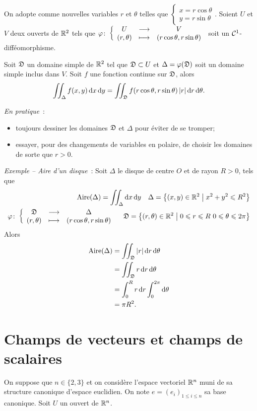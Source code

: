 \begin{theo}
  On adopte comme nouvelles variables \(r\) et \(\theta\) telles que \(\begin{cases} x=r\cos\theta \\ y=r\sin\theta \end{cases}\). Soient \(U\) et \(V\) deux ouverts de \(\mathbb{R}^2\) tels que \(\varphi\colon \left\{\begin{array}{ccc} U & \longrightarrow &V\\ (r, \theta) & \longmapsto & (r\cos\theta, r\sin\theta) \end{array} \right.\) soit un \(\mathcal{C}^{1}\)-difféomorphisme.

Soit \(\mathfrak{D}\) un domaine simple de \(\mathbb{R}^2\) tel que \(\mathfrak{D} \subset U\) et \(\Delta=\varphi(\mathfrak{D})\) soit un domaine simple inclus dans \(V\). Soit \(f\) une fonction continue sur \(\mathfrak{D}\), alors
\begin{equation}
   \iint_\Delta f(x,y)\mathop{}\mathopen{}\mathrm{d} x \mathop{}\mathopen{}\mathrm{d} y = \iint_{\mathfrak{D}} f(r\cos\theta, r\sin\theta) \left\lvert r\right\rvert\mathop{}\mathopen{}\mathrm{d} r \mathop{}\mathopen{}\mathrm{d} \theta.
\end{equation}
\end{theo}

\emph{En pratique}~:
\begin{itemize}
\item toujours dessiner les domaines \(\mathfrak{D}\) et \(\Delta\) pour éviter de se tromper;
\item essayer, pour des changements de variables en polaire, de choisir les domaines de sorte que \(r>0\).
\end{itemize}

\emph{Exemple -- Aire d'un disque}~: Soit \(\Delta\) le disque de centre \(O\) et de rayon \(R>0\), tels que
 \begin{align}
   \text{Aire}(\Delta) = \iint_\Delta \mathop{}\mathopen{}\mathrm{d} x \mathop{}\mathopen{}\mathrm{d} y \quad \Delta=\left\{(x,y)\in\mathbb{R}^2\mathrel{}\middle|\mathrel{}x^2+y^2\leqslant R^2\right\} \\
   \varphi\colon \left\{\begin{array}{ccc} \mathfrak{D} & \longrightarrow &\Delta\\ (r, \theta) & \longmapsto & (r\cos\theta, r\sin\theta) \end{array} \right. \quad \mathfrak{D}=\left\{(r,\theta)\in\mathbb{R}^2\mathrel{}\middle|\mathrel{}0 \leqslant r \leqslant R \ 0 \leqslant \theta \leqslant 2\pi\right\}
 \end{align}
Alors
\begin{align}
  \text{Aire}(\Delta) &= \iint_{\mathfrak{D}} \left\lvert r\right\rvert\mathop{}\mathopen{}\mathrm{d} r \mathop{}\mathopen{}\mathrm{d} \theta \\
  &= \iint_{\mathfrak{D}} r\mathop{}\mathopen{}\mathrm{d} r \mathop{}\mathopen{}\mathrm{d} \theta \\
  &=\int_0^R r\mathop{}\mathopen{}\mathrm{d} r \int_0^{2\pi}\mathop{}\mathopen{}\mathrm{d} \theta \\
  &=\pi R^2.
\end{align}


\section{Champs de vecteurs et champs de scalaires}
\label{sec:champvec}
On suppose que \(n \in \{2, 3\}\) et on considère l'espace vectoriel \(\mathbb{R}^n\) muni de sa structure canonique d'espace euclidien. On note \(e=(e_i)_{1 \leqslant i \leqslant n}\) sa base canonique. Soit \(U\) un ouvert de \(\mathbb{R}^n\).

